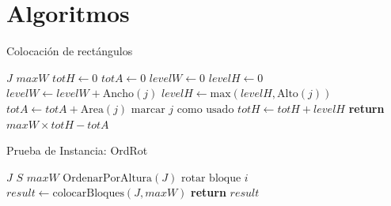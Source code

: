 \documentclass[letter, 10pt]{article}
\begin{document}
\section{Algoritmos} \label{sec:algs}
\begin{algorithm}[H]
    \caption{Colocación de rectángulos}
    \label{alg:colocacion}
    \begin{algorithmic}[1]
        \State $J$ 
        \State $maxW$ 
        \State $totH \gets 0$ 
        \State $totA \gets 0$ 
        \State $levelW \gets 0$ 
        \State $levelH \gets 0$ 
        \State $levelW \gets levelW + \text{Ancho}(j)$
        \State $levelH \gets \text{max}(levelH, \text{Alto}(j))$
        \State $totA \gets totA + \text{Area}(j)$
        \State $\text{marcar } j \text{ como usado}$
        \EndIf
        \EndIf
        \EndFor
        \State $totH \gets totH + levelH$ 
        \EndWhile
        \State \textbf{return} $maxW \times totH - totA$ 
        \EndProcedure
    \end{algorithmic}
\end{algorithm}



\begin{algorithm}[H]
    \caption{Prueba de Instancia: OrdRot}
    \label{alg:ordrot}
    \begin{algorithmic}[1]
        \State $J$ 
        \State $S$ 
        \State $maxW$ 
        \State $\text{OrdenarPorAltura}(J)$
        \State $\text{rotar bloque } i$ 
        \EndIf
        \EndFor
        \State $result \gets \text{colocarBloques}(J, maxW)$
        \State \textbf{return} $result$
        \EndProcedure
    \end{algorithmic}
\end{algorithm}
\end{document}
